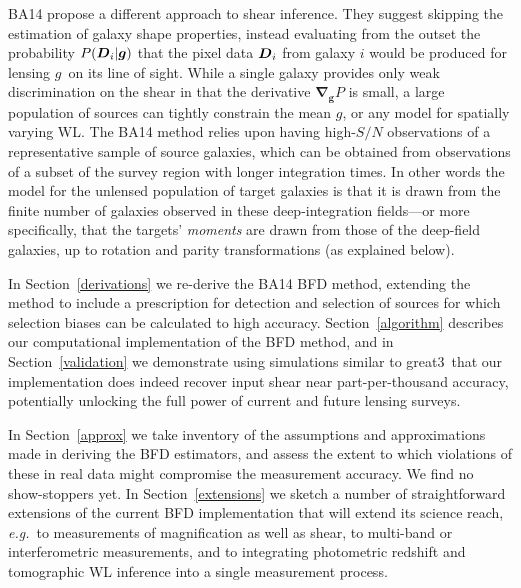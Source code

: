 \documentclass[11pt,preprint,flushrt]{aastex}
\newcommand\eg{{\it e.g.\/}}
\newcommand{\vecD}{\mbox{\boldmath $D$}}
\newcommand{\vecg}{\mbox{\boldmath $g$}}
\newcommand{\bnabg}{\boldsymbol{\nabla_g}}
\newcommand{\great}{{\sc great3}}
\newcommand\edit[1]{#1}
\begin{document}
BA14 propose a different approach to shear inference.  They suggest
skipping the estimation of galaxy shape properties, instead
evaluating from the outset the probability $P(\vecD_i |
\vecg)$ that the pixel data $\vecD_i$ from galaxy $i$ would be
produced for lensing \vecg\ on its line of sight.  While a single
galaxy provides only weak discrimination on the shear in that the
derivative $\bnabg P$ is small, a large population of sources can
tightly constrain the mean \vecg, or any model for spatially varying WL.
The BA14 method relies upon having high-$S/N$ observations
of a representative sample of source galaxies, which can be obtained from
observations of a subset of the survey region with longer integration times.
\edit{In other words the model for the unlensed population of target
  galaxies is that it is drawn from the finite number of galaxies
  observed in these deep-integration fields---or more specifically,
  that the targets' \emph{moments} are drawn from those of the
  deep-field galaxies, up to rotation and parity transformations (as
  explained below).}

In Section~\ref{derivations} we re-derive the
BA14 BFD method, extending the method to include a prescription for
detection and selection of sources for which selection biases can be
calculated to high accuracy.  Section~\ref{algorithm} describes our
computational implementation of the BFD method, and in Section~\ref{validation}
we demonstrate using simulations similar to \great\ that our
implementation does indeed recover input shear near part-per-thousand
accuracy, potentially unlocking the full power of current and future
lensing surveys.

In Section~\ref{approx} we take inventory of the assumptions and
approximations made in deriving the BFD estimators, and assess the
extent to which violations of these in real data might compromise the
measurement accuracy.  We find no show-stoppers yet.  In
Section~\ref{extensions} we sketch a number of straightforward
extensions of the current BFD implementation that will extend its
science reach, \eg\ to measurements of magnification as well as shear,
to multi-band or interferometric measurements, and to integrating
photometric redshift and tomographic WL inference into a single
measurement process.
\end{document}
